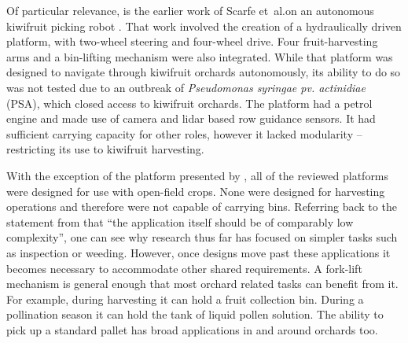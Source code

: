 \documentclass[preprint,authoryear,12pt]{elsarticle}
\begin{document}
        Of particular relevance, is the earlier work of Scarfe et~al.\@ on an autonomous kiwifruit picking robot \citep{scarfe2009, Scarfe2012}.
        That work involved the creation of a hydraulically driven platform, with two-wheel steering and four-wheel drive.
        Four fruit-harvesting arms and a bin-lifting mechanism were also integrated.
        While that platform was designed to navigate through kiwifruit orchards autonomously, its ability to do so was not tested due to an outbreak of \textit{Pseudomonas syringae pv. actinidiae} (PSA), which closed access to kiwifruit orchards.
        The platform had a petrol engine and made use of camera and lidar based row guidance sensors.
        It had sufficient carrying capacity for other roles, however it lacked modularity -- restricting its use to kiwifruit harvesting.

        With the exception of the platform presented by \cite{Scarfe2012}, all of the reviewed platforms were designed for use with open-field crops.
        None were designed for harvesting operations and therefore were not capable of carrying bins.
        Referring back to the statement from \cite{Ruckelshausen2009} that ``the application itself should be of comparably low complexity'', one can see why research thus far has focused on simpler tasks such as inspection or weeding.
        However, once designs move past these applications it becomes necessary to accommodate other shared requirements.
        A fork-lift mechanism is general enough that most orchard related tasks can benefit from it.
        For example, during harvesting it can hold a fruit collection bin.
        During a pollination season it can hold the tank of liquid pollen solution.
        The ability to pick up a standard pallet has broad applications in and around orchards too.
\end{document}
